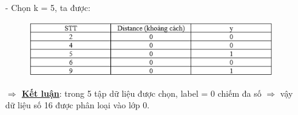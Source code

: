 \documentclass{report}
\begin{document}
\begin{enumerate}
            \pagebreak
        
            \item [- ] Chọn k = 5, ta được:
                \begin{center}
                    \begin{figure}[htp]
                        \begin{center}
                            \includegraphics[scale = 1]{image/result_after_choosingK.PNG}
                        \end{center}
                    \end{figure}
                \end{center}
            \fontsize{13}{10}\selectfont\textbf{$\Longrightarrow$ \underline{\underline{{Kết luận}}}}: trong 5 tập dữ liệu được chọn, label = 0 chiếm đa số $\Rightarrow$ vậy dữ liệu số 16 được phân loại vào lớp 0.
        \end{enumerate}
        
    \fontsize{16}{10}\selectfont
\end{document}
